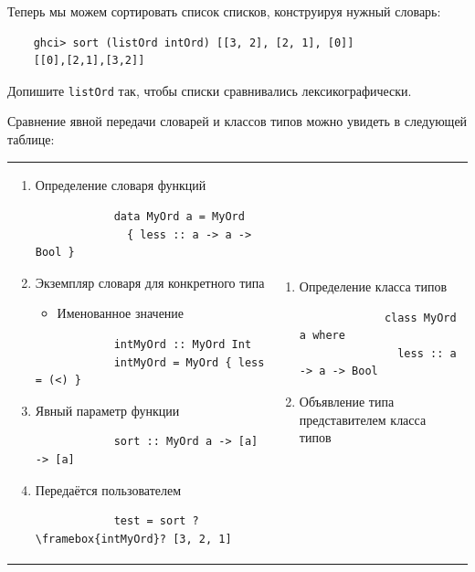 Теперь мы можем сортировать список списков, конструируя нужный словарь:
\begin{verbatim}
    ghci> sort (listOrd intOrd) [[3, 2], [2, 1], [0]]
    [[0],[2,1],[3,2]]
\end{verbatim}

\begin{task}
    Допишите \texttt{listOrd} так, чтобы списки сравнивались лексикографически.
\end{task}

Сравнение явной передачи словарей и классов типов можно увидеть в следующей таблице:

\begin{tabular}{p{8cm}p{8cm}}
    \begin{enumerate}
        \item Определение словаря функций
        \begin{verbatim}
            data MyOrd a = MyOrd
              { less :: a -> a -> Bool }
        \end{verbatim}
        \item Экземпляр словаря для конкретного типа
        \begin{itemize}
            \item Именованное значение
        \end{itemize}
        \begin{verbatim}
            intMyOrd :: MyOrd Int
            intMyOrd = MyOrd { less = (<) }
        \end{verbatim}
        \item Явный параметр функции
        \begin{verbatim}
            sort :: MyOrd a -> [a] -> [a]
        \end{verbatim}
        \item Передаётся пользователем
        \begin{verbatim}
            test = sort ?\framebox{intMyOrd}? [3, 2, 1]
        \end{verbatim}
    \end{enumerate}
    &
    \begin{enumerate}
        \item Определение класса типов
        \begin{verbatim}
             class MyOrd a where
               less :: a -> a -> Bool
        \end{verbatim}
        \item Объявление типа представителем класса типов

\end{enumerate}
\end{tabular}
